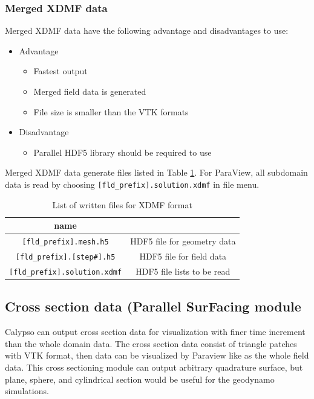 \subsubsection{Merged XDMF data}
Merged XDMF data have the following advantage and disadvantages to use:
%
\begin{itemize}
\item Advantage
\begin{itemize} 
\item Fastest output
\item Merged field data is generated
\item File size is smaller than the VTK formats
\end{itemize}
\item Disadvantage
\begin{itemize} 
\item Parallel HDF5 library should be required to use
\end{itemize}
\end{itemize}
%
Merged XDMF data generate files listed in Table \ref{table:XDMF}. For ParaView, all subdomain data is read by choosing \verb|[fld_prefix].solution.xdmf| in file menu.
%
\begin{table}[htp]
\caption{List of written files for XDMF format}
\begin{center} 
\begin{tabular}{|c|c|}
\hline
 name &  \\ \hline \hline
\verb|[fld_prefix].mesh.h5|  & HDF5 file for geometry data \\ \hline
\verb|[fld_prefix].[step#].h5|  &HDF5 file for field data   \\ \hline
\verb|[fld_prefix].solution.xdmf|  & HDF5 file lists to be read  \\ \hline
\end{tabular}
\end{center}
\label{table:XDMF}
\end{table}
%

%
\subsection{Cross section data (Parallel SurFacing module}
\label{section:PSF}
Calypso can output cross section data for visualization with finer time increment than the whole domain data. The cross section data consist of triangle patches with VTK format, then data can be visualized by Paraview like as the whole field data. This cross sectioning module can output arbitrary quadrature surface, but plane, sphere, and cylindrical section would be useful for the geodynamo simulations.


